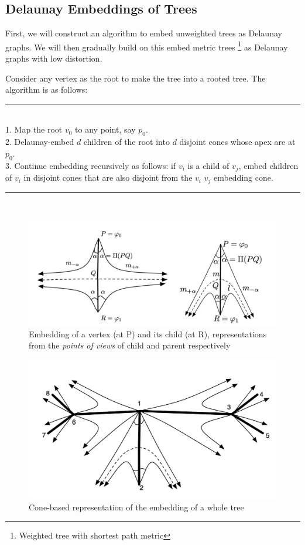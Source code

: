 \subsection{Delaunay Embeddings of Trees}
First, we will construct an algorithm to embed unweighted trees as Delaunay graphs. We will then gradually build on this embed metric trees \footnote{Weighted tree with shortest path metric} as Delaunay graphs with low distortion.

Consider any vertex as the root to make the tree into a rooted tree. The algorithm is as follows: \\
\rule{\linewidth}{0.5pt} \\
1. Map the root $v_0$ to any point, say $p_0$. \\
2. Delaunay-embed $d$ children of the root into $d$ disjoint cones whose apex are at $p_0$. \\
3. Continue embedding recursively as follows: if $v_i$ is a child of $v_j$, embed children of $v_i$ in disjoint cones that are also disjoint from the $v_i$ $v_j$ embedding cone.  \\
\rule{\linewidth}{0.5pt} \\

\begin{figure}
    \centering
    \includegraphics[width=\textwidth]{chapter_14/files/cone2.png}
    \caption{Embedding of a vertex (at P) and its child (at R), representations from the \textit{points of views} of child and parent respectively}
    \label{fig:cone_two}
\end{figure}

\begin{figure}
    \centering
    \includegraphics[width=\textwidth]{chapter_14/files/conem.png}
    \caption{Cone-based representation of the embedding of a whole tree}
    \label{fig:cone_multiple}
\end{figure}

